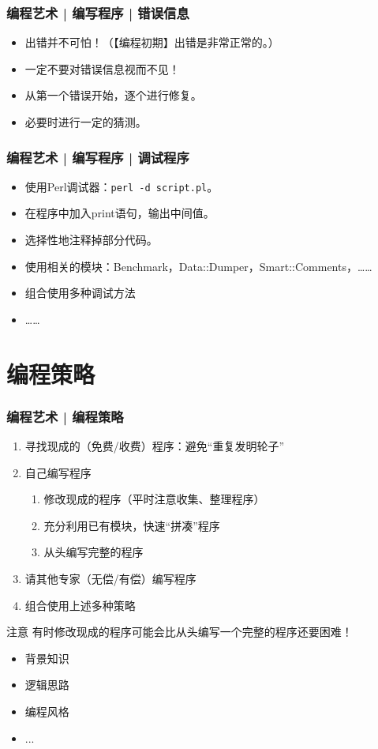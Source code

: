 \begin{frame}
  \frametitle{编程艺术 | 编写程序 | 错误信息}
  \begin{itemize}
    \item 出错并不可怕！（【编程初期】出错是非常正常的。）
    \item 一定不要对错误信息视而不见！
    \item 从第一个错误开始，逐个进行修复。
    \item 必要时进行一定的猜测。
  \end{itemize}
\end{frame}

\begin{frame}[fragile]
  \frametitle{编程艺术 | 编写程序 | \alert{调试程序}}
  \begin{itemize}
    \item 使用Perl调试器：\verb|perl -d script.pl|。
    \item 在程序中加入print语句，输出中间值。
    \item 选择性地注释掉部分代码。
    \item 使用相关的模块：Benchmark，Data::Dumper，Smart::Comments，……
    \item 组合使用多种调试方法
    \item ……
  \end{itemize}
\end{frame}

\section{编程策略}
\begin{frame}
  \frametitle{编程艺术 | \alert{编程策略}}
  \begin{enumerate}
    \item 寻找现成的（免费/收费）程序：避免“重复发明轮子”
    \item 自己编写程序
      \begin{enumerate}
	\item 修改现成的程序（平时注意收集、整理程序）
	\item 充分利用已有模块，快速“拼凑”程序
	\item 从头编写完整的程序
      \end{enumerate}
    \item 请其他专家（无偿/有偿）编写程序
    \item 组合使用上述多种策略
  \end{enumerate}
  \pause
  \begin{block}{注意}
    有时修改现成的程序可能会比从头编写一个完整的程序还要困难！
    \begin{itemize}
      \item 背景知识
      \item 逻辑思路
      \item 编程风格
      \item ...
    \end{itemize}
  \end{block}
\end{frame}

